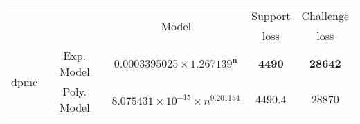 \begin{tabular}{ccccc} 
\hline 
 &  & \multirow{2}{*}{Model} & Support & Challenge\tabularnewline 
 &  &  & loss  & loss\tabularnewline 
\hline 
\hline 
\multirow{2}{*}{dpmc} & Exp. Model & $\mathbf{0.0003395025\times 1.267139^{n}}$ & $\mathbf{4490}$ & $\mathbf{28642}$ \tabularnewline 
 & Poly. Model & $8.075431\times10^{-15}\times n^{9.201154}$ & $4490.4$ & $28870$ \tabularnewline 
\hline 
\end{tabular} 

